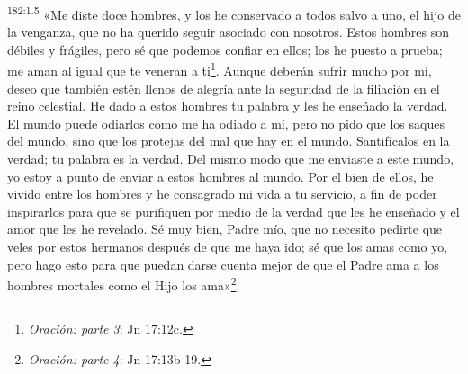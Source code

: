 \par
\textsuperscript{182:1.5} «Me diste doce hombres, y los he conservado a todos salvo a uno, el hijo de la venganza, que no ha querido seguir asociado con nosotros. Estos hombres son débiles y frágiles, pero sé que podemos confiar en ellos; los he puesto a prueba; me aman al igual que te veneran a ti\footnote{\textit{Oración: parte 3}: Jn 17:12c.}. Aunque deberán sufrir mucho por mí, deseo que también estén llenos de alegría ante la seguridad de la filiación en el reino celestial. He dado a estos hombres tu palabra y les he enseñado la verdad. El mundo puede odiarlos como me ha odiado a mí, pero no pido que los saques del mundo, sino que los protejas del mal que hay en el mundo. Santifícalos en la verdad; tu palabra es la verdad. Del mismo modo que me enviaste a este mundo, yo estoy a punto de enviar a estos hombres al mundo. Por el bien de ellos, he vivido entre los hombres y he consagrado mi vida a tu servicio, a fin de poder inspirarlos para que se purifiquen por medio de la verdad que les he enseñado y el amor que les he revelado. Sé muy bien, Padre mío, que no necesito pedirte que veles por estos hermanos después de que me haya ido; sé que los amas como yo, pero hago esto para que puedan darse cuenta mejor de que el Padre ama a los hombres mortales como el Hijo los ama»\footnote{\textit{Oración: parte 4}: Jn 17:13b-19.}.

